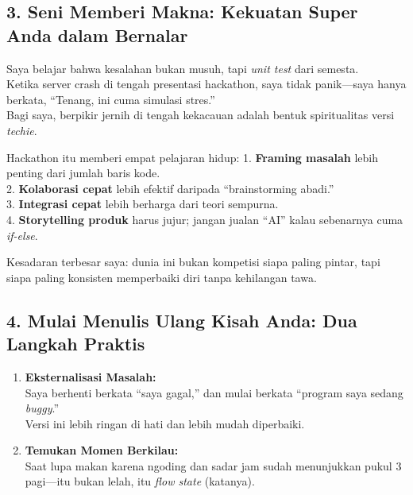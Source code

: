 \documentclass[
  letterpaper,
  DIV=11,
  numbers=noendperiod]{scrreprt}
\begin{document}
\subsection{\texorpdfstring{\textbf{3. Seni Memberi Makna: Kekuatan
Super Anda dalam
Bernalar}}{3. Seni Memberi Makna: Kekuatan Super Anda dalam Bernalar}}\label{seni-memberi-makna-kekuatan-super-anda-dalam-bernalar}

Saya belajar bahwa kesalahan bukan musuh, tapi \emph{unit test} dari
semesta.\\
Ketika server crash di tengah presentasi hackathon, saya tidak
panik---saya hanya berkata, ``Tenang, ini cuma simulasi stres.''\\
Bagi saya, berpikir jernih di tengah kekacauan adalah bentuk
spiritualitas versi \emph{techie}.

Hackathon itu memberi empat pelajaran hidup: 1. \textbf{Framing masalah}
lebih penting dari jumlah baris kode.\\
2. \textbf{Kolaborasi cepat} lebih efektif daripada ``brainstorming
abadi.''\\
3. \textbf{Integrasi cepat} lebih berharga dari teori sempurna.\\
4. \textbf{Storytelling produk} harus jujur; jangan jualan ``AI'' kalau
sebenarnya cuma \emph{if-else}.

Kesadaran terbesar saya: dunia ini bukan kompetisi siapa paling pintar,
tapi siapa paling konsisten memperbaiki diri tanpa kehilangan tawa.

\subsection{\texorpdfstring{\textbf{4. Mulai Menulis Ulang Kisah Anda:
Dua Langkah
Praktis}}{4. Mulai Menulis Ulang Kisah Anda: Dua Langkah Praktis}}\label{mulai-menulis-ulang-kisah-anda-dua-langkah-praktis}

\begin{enumerate}
\def\labelenumi{\arabic{enumi}.}
\item
  \textbf{Eksternalisasi Masalah:}\\
  Saya berhenti berkata ``saya gagal,'' dan mulai berkata ``program saya
  sedang \emph{buggy}.''\\
  Versi ini lebih ringan di hati dan lebih mudah diperbaiki.
\item
  \textbf{Temukan Momen Berkilau:}\\
  Saat lupa makan karena ngoding dan sadar jam sudah menunjukkan pukul 3
  pagi---itu bukan lelah, itu \emph{flow state} (katanya).
\end{enumerate}
\end{document}
